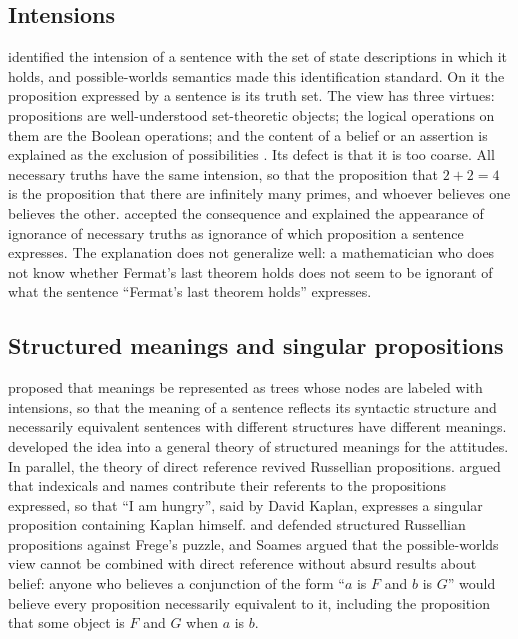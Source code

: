 \documentclass{situationist-preprint}
\begin{document}
\subsection{Intensions}

\citet{Carnap1947} identified the intension of a sentence with the set of state descriptions in which it holds, and possible-worlds semantics made this identification standard. On it the proposition expressed by a sentence is its truth set. The view has three virtues: propositions are well-understood set-theoretic objects; the logical operations on them are the Boolean operations; and the content of a belief or an assertion is explained as the exclusion of possibilities \citep{Stalnaker1984}. Its defect is that it is too coarse. All necessary truths have the same intension, so that the proposition that $2+2=4$ is the proposition that there are infinitely many primes, and whoever believes one believes the other. \citet{Stalnaker1984} accepted the consequence and explained the appearance of ignorance of necessary truths as ignorance of which proposition a sentence expresses. The explanation does not generalize well: a mathematician who does not know whether Fermat's last theorem holds does not seem to be ignorant of what the sentence \enquote{Fermat's last theorem holds} expresses.

\subsection{Structured meanings and singular propositions}

\citet{Lewis1970} proposed that meanings be represented as trees whose nodes are labeled with intensions, so that the meaning of a sentence reflects its syntactic structure and necessarily equivalent sentences with different structures have different meanings. \citet{Cresswell1985} developed the idea into a general theory of structured meanings for the attitudes. In parallel, the theory of direct reference revived Russellian propositions. \citet{Kaplan1989} argued that indexicals and names contribute their referents to the propositions expressed, so that \enquote{I am hungry}, said by David Kaplan, expresses a singular proposition containing Kaplan himself. \citet{Salmon1986} and \citet{Soames1987} defended structured Russellian propositions against Frege's puzzle, and Soames argued that the possible-worlds view cannot be combined with direct reference without absurd results about belief: anyone who believes a conjunction of the form \enquote{$a$ is $F$ and $b$ is $G$} would believe every proposition necessarily equivalent to it, including the proposition that some object is $F$ and $G$ when $a$ is $b$.
\end{document}
